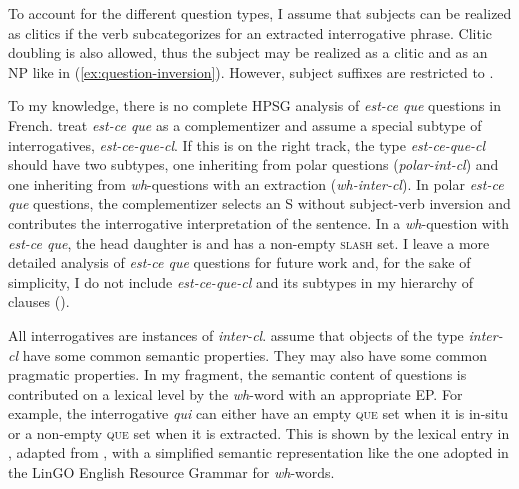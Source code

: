To account for the different question types, I assume that subjects can be realized as clitics if the verb subcategorizes for an extracted interrogative phrase. Clitic doubling is also allowed, thus the subject may be realized as a clitic and as an NP like in (\ref{ex:question-inversion}). However, subject suffixes are restricted to \avm{[mc & \normalfont{+}]}. 

To my knowledge, there is no complete HPSG analysis of \emph{est-ce que} questions in French. \citet[70]{Abeille.2012} treat \emph{est-ce que} as a complementizer and assume a special subtype of interrogatives, \emph{est-ce-que-cl}. If this is on the right track, the type \emph{est-ce-que-cl} should have two subtypes, one inheriting from polar questions (\emph{polar-int-cl}) and one inheriting from \emph{wh}-questions with an extraction (\emph{wh-inter-cl}). In polar \emph{est-ce que} questions, the complementizer selects an S without subject-verb inversion and contributes the interrogative interpretation of the sentence. In a \emph{wh}-question with \emph{est-ce que}, the head daughter is  and has a non-empty \textsc{slash} set. 
I leave a more detailed analysis of \emph{est-ce que} questions for future work and, for the sake of simplicity, I do not include \emph{est-ce-que-cl} and its subtypes in my hierarchy of clauses ().

All interrogatives are instances of \emph{inter-cl}. \citet[42]{Ginzburg.2000} assume that objects of the type \emph{inter-cl} have some common semantic properties. They may also have some common pragmatic properties. In my fragment, the semantic content of questions is contributed on a lexical level by the \emph{wh}-word with an appropriate EP. For example, the interrogative \emph{qui} can either have an empty \textsc{que} set when it is in-situ or a non-empty \textsc{que} set when it is extracted. This is shown by the lexical entry in , adapted from \citet[185]{Ginzburg.2000}, with a simplified semantic representation like the one adopted in the LinGO English Resource Grammar for \emph{wh}-words.

